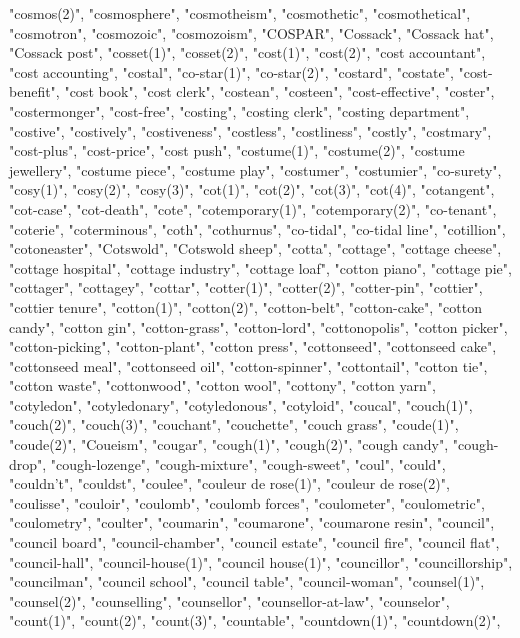 "cosmos(2)",
"cosmosphere",
"cosmotheism",
"cosmothetic",
"cosmothetical",
"cosmotron",
"cosmozoic",
"cosmozoism",
"COSPAR",
"Cossack",
"Cossack hat",
"Cossack post",
"cosset(1)",
"cosset(2)",
"cost(1)",
"cost(2)",
"cost accountant",
"cost accounting",
"costal",
"co-star(1)",
"co-star(2)",
"costard",
"costate",
"cost-benefit",
"cost book",
"cost clerk",
"costean",
"costeen",
"cost-effective",
"coster",
"costermonger",
"cost-free",
"costing",
"costing clerk",
"costing department",
"costive",
"costively",
"costiveness",
"costless",
"costliness",
"costly",
"costmary",
"cost-plus",
"cost-price",
"cost push",
"costume(1)",
"costume(2)",
"costume jewellery",
"costume piece",
"costume play",
"costumer",
"costumier",
"co-surety",
"cosy(1)",
"cosy(2)",
"cosy(3)",
"cot(1)",
"cot(2)",
"cot(3)",
"cot(4)",
"cotangent",
"cot-case",
"cot-death",
"cote",
"cotemporary(1)",
"cotemporary(2)",
"co-tenant",
"coterie",
"coterminous",
"coth",
"cothurnus",
"co-tidal",
"co-tidal line",
"cotillion",
"cotoneaster",
"Cotswold",
"Cotswold sheep",
"cotta",
"cottage",
"cottage cheese",
"cottage hospital",
"cottage industry",
"cottage loaf",
"cotton piano",
"cottage pie",
"cottager",
"cottagey",
"cottar",
"cotter(1)",
"cotter(2)",
"cotter-pin",
"cottier",
"cottier tenure",
"cotton(1)",
"cotton(2)",
"cotton-belt",
"cotton-cake",
"cotton candy",
"cotton gin",
"cotton-grass",
"cotton-lord",
"cottonopolis",
"cotton picker",
"cotton-picking",
"cotton-plant",
"cotton press",
"cottonseed",
"cottonseed cake",
"cottonseed meal",
"cottonseed oil",
"cotton-spinner",
"cottontail",
"cotton tie",
"cotton waste",
"cottonwood",
"cotton wool",
"cottony",
"cotton yarn",
"cotyledon",
"cotyledonary",
"cotyledonous",
"cotyloid",
"coucal",
"couch(1)",
"couch(2)",
"couch(3)",
"couchant",
"couchette",
"couch grass",
"coude(1)",
"coude(2)",
"Coueism",
"cougar",
"cough(1)",
"cough(2)",
"cough candy",
"cough-drop",
"cough-lozenge",
"cough-mixture",
"cough-sweet",
"coul",
"could",
"couldn't",
"couldst",
"coulee",
"couleur de rose(1)",
"couleur de rose(2)",
"coulisse",
"couloir",
"coulomb",
"coulomb forces",
"coulometer",
"coulometric",
"coulometry",
"coulter",
"coumarin",
"coumarone",
"coumarone resin",
"council",
"council board",
"council-chamber",
"council estate",
"council fire",
"council flat",
"council-hall",
"council-house(1)",
"council house(1)",
"councillor",
"councillorship",
"councilman",
"council school",
"council table",
"council-woman",
"counsel(1)",
"counsel(2)",
"counselling",
"counsellor",
"counsellor-at-law",
"counselor",
"count(1)",
"count(2)",
"count(3)",
"countable",
"countdown(1)",
"countdown(2)",
